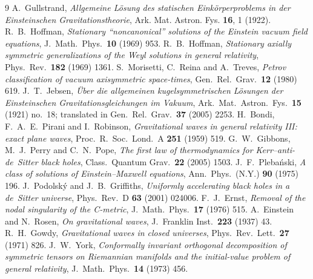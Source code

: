 \documentclass[11pt,a4paper]{article}
\theoremstyle{definition}
\begin{document}
\begin{thebibliography}{9}
A.~Gullstrand,
\emph{Allgemeine L\"osung des statischen Eink\"orperproblems in der Einsteinschen Gravitationstheorie},
Ark. Mat. Astron. Fys. \textbf{16}, 1 (1922).
 R.~B.~Hoffman, \emph{Stationary ``noncanonical'' solutions of the Einstein vacuum field equations}, J.\ Math.\ Phys.\ \textbf{10} (1969) 953.
 R.~B.~Hoffman, \emph{Stationary axially symmetric generalizations of the Weyl solutions in general relativity}, Phys.\ Rev.\ \textbf{182} (1969) 1361.
 S.~Morisetti, C.~Reina and A.~Treves, \emph{Petrov classification of vacuum axisymmetric space-times}, Gen.\ Rel.\ Grav.\ \textbf{12} (1980) 619.
 J.~T.~Jebsen, \emph{\"Uber die allgemeinen kugelsymmetrischen L\"osungen der Einsteinschen Gravitationsgleichungen im Vakuum}, Ark.\ Mat.\ Astron.\ Fys.\ \textbf{15} (1921) no.~18; translated in Gen.\ Rel.\ Grav.\ \textbf{37} (2005) 2253.
 H.~Bondi, F.~A.~E.~Pirani and I.~Robinson, \emph{Gravitational waves in general relativity III: exact plane waves}, Proc.\ R.\ Soc.\ Lond.\ A \textbf{251} (1959) 519.
 G.~W.~Gibbons, M.~J.~Perry and C.~N.~Pope, \emph{The first law of thermodynamics for Kerr--anti-de~Sitter black holes}, Class.\ Quantum Grav.\ \textbf{22} (2005) 1503.
 J.~F.~Pleba\'nski, \emph{A class of solutions of Einstein--Maxwell equations}, Ann.\ Phys.\ (N.Y.) \textbf{90} (1975) 196.
 J.~Podolsk\'y and J.~B.~Griffiths, \emph{Uniformly accelerating black holes in a de~Sitter universe}, Phys.\ Rev.\ D \textbf{63} (2001) 024006.
 F.~J.~Ernst, \emph{Removal of the nodal singularity of the C-metric}, J.\ Math.\ Phys.\ \textbf{17} (1976) 515.
 A.~Einstein and N.~Rosen, \emph{On gravitational waves}, J.\ Franklin Inst.\ \textbf{223} (1937) 43.
 R.~H.~Gowdy, \emph{Gravitational waves in closed universes}, Phys.\ Rev.\ Lett.\ \textbf{27} (1971) 826.
 J.~W.~York, \emph{Conformally invariant orthogonal decomposition of symmetric tensors on Riemannian manifolds and the initial-value problem of general relativity}, J.\ Math.\ Phys.\ \textbf{14} (1973) 456.
\end{thebibliography}



\end{document}
